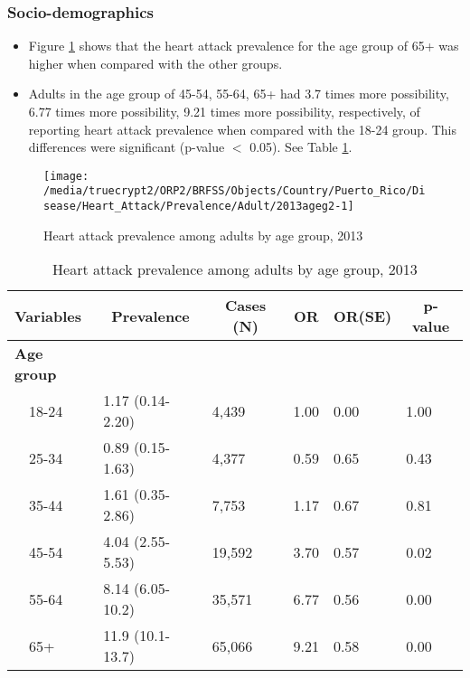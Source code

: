 \newpage
\subsubsection{Socio-demographics}

\begin{itemize}

\item Figure \ref{fig:age.Heart_Attack.2013} shows that the heart attack prevalence for the age group of
65+
was higher when compared with the other groups.

\item Adults in the age group of 45-54, 55-64, 65+ had 3.7 times more possibility, 6.77 times more possibility, 9.21 times more possibility, respectively, of reporting heart attack prevalence when compared with the 18-24 group. This differences were significant (p-value $<$ 0.05). See Table \ref{tab:age.Heart_Attack.2013}.


\end{itemize}


\begin{figure}[H]
\caption{Heart attack prevalence among adults by age group, 
2013}
\begin{knitrout}
\color{fgcolor}

{\centering \texttt{[image: /media/truecrypt2/ORP2/BRFSS/Objects/Country/Puerto\_Rico/Disease/Heart\_Attack/Prevalence/Adult/2013ageg2-1]} 

}



\end{knitrout}
\label{fig:age.Heart_Attack.2013}
\end{figure}

\begin{table}[H]
\caption{Heart attack prevalence  among adults by age group, 2013\label{tab:age.Heart_Attack.2013}} 
\begin{center}
\begin{tabular}{llllll}
\hline\hline
\multicolumn{1}{l}{Variables}&\multicolumn{1}{c}{Prevalence}&\multicolumn{1}{c}{Cases (N)}&\multicolumn{1}{c}{OR}&\multicolumn{1}{c}{OR(SE)}&\multicolumn{1}{c}{p-value}\tabularnewline
\hline
{\bfseries Age group}&&&&&\tabularnewline
~~18-24&1.17 (0.14-2.20)& 4,439&1.00&0.00&1.00\tabularnewline
~~25-34&0.89 (0.15-1.63)& 4,377&0.59&0.65&0.43\tabularnewline
~~35-44&1.61 (0.35-2.86)& 7,753&1.17&0.67&0.81\tabularnewline
~~45-54&4.04 (2.55-5.53)&19,592&3.70&0.57&0.02\tabularnewline
~~55-64&8.14 (6.05-10.2)&35,571&6.77&0.56&0.00\tabularnewline
~~65+&11.9 (10.1-13.7)&65,066&9.21&0.58&0.00\tabularnewline
\hline
\end{tabular}\end{center}

\end{table}


